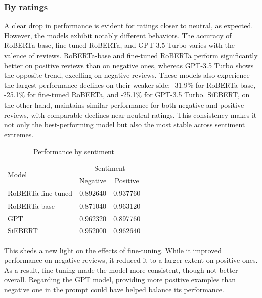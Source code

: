 \documentclass{article}
\begin{document}
\subsubsection{By ratings}

A clear drop in performance is evident for ratings closer to neutral, as expected. However, the models exhibit notably different behaviors. The accuracy of RoBERTa-base, fine-tuned RoBERTa, and GPT-3.5 Turbo varies with the valence of reviews. RoBERTa-base and fine-tuned RoBERTa perform significantly better on positive reviews than on negative ones, whereas GPT-3.5 Turbo shows the opposite trend, excelling on negative reviews. These models also experience the largest performance declines on their weaker side: -31.9\% for RoBERTa-base, -25.1\% for fine-tuned RoBERTa, and -25.1\% for GPT-3.5 Turbo. SiEBERT, on the other hand, maintains similar performance for both negative and positive reviews, with comparable declines near neutral ratings. This consistency makes it not only the best-performing model but also the most stable across sentiment extremes.

\begin{table}
  \caption{Performance by sentiment}
  \label{tab:perfs_by_sentiment}
  \centering
  \begin{tabular}{lcc}
    \toprule
    \multirow{2}{*}{\centering Model} & \multicolumn{2}{c}{Sentiment} \\
    \cmidrule{2-3}
    & Negative & Positive \\
    \midrule
    RoBERTa fine-tuned & 0.892640 & 0.937760 \\
    RoBERTa base & 0.871040 & 0.963120 \\
    GPT & 0.962320 & 0.897760 \\
    SiEBERT & 0.952000 & 0.962640 \\
    \bottomrule
  \end{tabular}
\end{table}

This sheds a new light on the effects of fine-tuning. While it improved performance on negative reviews, it reduced it to a larger extent on positive ones. As a result, fine-tuning made the model more consistent, though not better overall. Regarding the GPT model, providing more positive examples than negative one in the prompt could have helped balance its performance.
\end{document}
